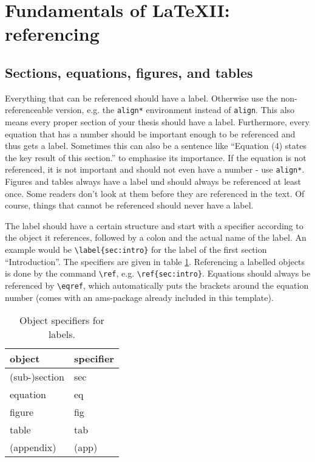 \section{Fundamentals of \LaTeX II: referencing}\label{sec:referencing}

\subsection{Sections, equations, figures, and tables}
\label{sec:refseceq}

Everything that can be referenced should have a label. Otherwise use the
non-referenceable version, e.g. the \verb!align*! environment instead of
\verb!align!. This also means every proper section of your thesis should have a
label. Furthermore, every equation that has a number should be important
enough to be referenced and thus gets a label. Sometimes this can also be a
sentence like ``Equation (4) states the key result of this section.'' to
emphasise its importance. If the equation is not referenced, it is not
important and should not even have a number - use \verb!align*!. Figures and
tables always have a label und should always be referenced at least
once. Some readers don't look at them before they are referenced in the
text. Of course, things that cannot be referenced should
never have a label. 

The label should have a certain structure and start with a specifier
according to the object it references, followed by a colon and the actual name
of the label. An example would be \verb!\label{sec:intro}! for the label of
the first section ``Introduction''. The specifiers are given in table
\ref{tab:labelspec}. Referencing a labelled objects is done by the command
\verb!\ref!, e.g. \verb!\ref{sec:intro}!. Equations should always be
referenced by \verb!\eqref!, which automatically puts the brackets around the
equation number (comes with an ams-package already included in this
template).

\begin{table}[h]
  \centering
  \begin{tabular}{|l|l|}\hline
    \bf object & \bf specifier \\\hline
    (sub-)section & sec\\
    equation & eq\\
    figure & fig\\
    table & tab\\ 
    (appendix) & (app)\\ \hline
  \end{tabular}
  \caption{Object specifiers for labels.}
  \label{tab:labelspec}
\end{table}

